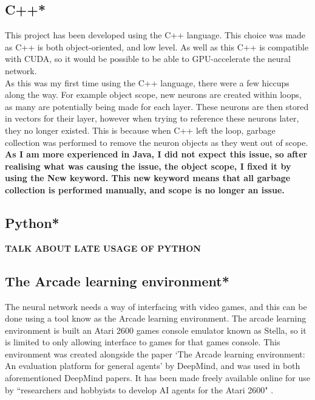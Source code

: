\documentclass[10pt]{article}
\begin{document}
	\bigskip
	
	\subsection{C++*}
		This project has been developed using the C++ language. This choice was made as C++ is both object-oriented, and low level. As well as this C++ is compatible with CUDA, so it would be possible to be able to GPU-accelerate the neural network.\\
	
		As this was my first time using the C++ language, there were a few hiccups along the way. For example object scope, new neurons are created within loops, as many are potentially being made for each layer. These neurons are then stored in vectors for their layer, however when trying to reference these neurons later, they no longer existed. This is because when C++ left the loop, garbage collection was performed to remove the neuron objects as they went out of scope. \textbf{As I am more experienced in Java, I did not expect this issue, so after realising what was causing the issue, the object scope, I fixed it by using the New keyword. This new keyword means that all garbage collection is performed manually, and scope is no longer an issue.}
	
	\bigskip
	
	\subsection{Python*}
	\textbf{TALK ABOUT LATE USAGE OF PYTHON}
	
	\bigskip
	
	\subsection{The Arcade learning environment*}
	
		The neural network needs a way of interfacing with video games, and this can be done using a tool know as the Arcade learning environment. The arcade learning environment is built an Atari 2600 games console emulator known as Stella, so it is limited to only allowing interface to games for that games console. This environment was created alongside the paper `The Arcade learning environment: An evaluation platform for general agents' \cite{ale} by DeepMind, and was used in both aforementioned DeepMind papers. It has been made freely available online for use by ``researchers and hobbyists to develop AI agents for the Atari 2600" \cite{ale}.\\
		
\end{document}
